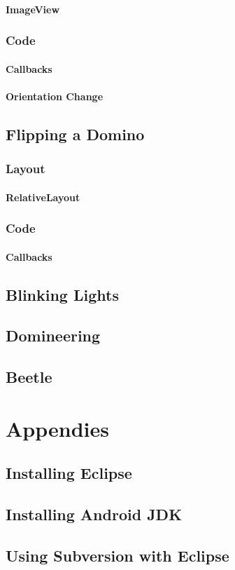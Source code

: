 \documentclass[10pt]{book}
\begin{document}
\subsection{ImageView}
\section{Code}
\subsection{Callbacks}
\subsection{Orientation Change}

\chapter{Flipping a Domino}
\section{Layout}
\subsection{RelativeLayout}
\section{Code}
\subsection{Callbacks}

\chapter{Blinking Lights}

\chapter{Domineering}

\chapter{Beetle}

\part{Appendies}

\appendix

\chapter{Installing Eclipse}
\chapter{Installing Android JDK}
\chapter{Using Subversion with Eclipse}
\end{document}
